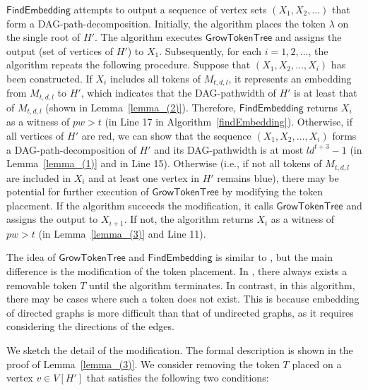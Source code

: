 \documentclass[runningheads]{llncs}
\theoremstyle{plain}
\theoremstyle{definition}
\begin{document}
$\mathsf{FindEmbedding}$ attempts to output a sequence of vertex sets $(X_1, X_2, \dots)$ that form a DAG-path-decomposition. Initially, the algorithm places the token $\lambda$ on the single root of $H'$. The algorithm executes $\mathsf{GrowTokenTree}$ and assigns the output (set of vertices of $H'$) to $X_1$. Subsequently, for each $i = 1,2,\ldots$, the algorithm repeats the following procedure. Suppose that $(X_1, X_2, \dots , X_i)$ has been constructed. If $X_i$ includes all tokens of $M_{t, d, l}$, it represents an embedding from $M_{t, d, l}$ to $H'$, which indicates that the DAG-pathwidth of $H'$ is at least that of $M_{t, d, l}$ (shown in Lemma~\ref{lemma_(2)}). Therefore, $\mathsf{FindEmbedding}$ returns $X_i$ as a witness of $pw > t$ (in Line 17 in Algorithm~\ref{findEmbedding}).  Otherwise, if all vertices of $H'$ are red, we can show that the sequence $(X_1, X_2, \dots, X_i)$ forms a DAG-path-decomposition of $H'$ and its DAG-pathwidth is at most $ld^{t+3}-1$ (in Lemma~\ref{lemma_(1)} and in Line 15). Otherwise (i.e., if not all tokens of $M_{t, d, l}$ are included in $X_i$ and at least one vertex in $H'$ remains blue), there may be potential for further execution of $\mathsf{GrowTokenTree}$ by modifying the token placement. If the algorithm succeeds the modification, it calls $\mathsf{GrowTokenTree}$ and assigns the output to $X_{i+1}$. If not, the algorithm returns $X_i$ as a witness of $pw > t$ (in Lemma~\ref{lemma_(3)} and Line 11).

The idea of $\mathsf{GrowTokenTree}$ and $\mathsf{FindEmbedding}$ is similar to \cite{art8}, but the main difference is the modification of the token placement. In \cite{art8}, there always exists a removable token $T$ until the algorithm terminates. In contrast, in this algorithm, there may be cases where such a token does not exist. This is because embedding of directed graphs is more difficult than that of undirected graphs, as it requires considering the directions of the edges. 

We sketch the detail of the modification. The formal description is shown in the proof of Lemma~\ref{lemma_(3)}.
We consider removing the token $T$ placed on a vertex $v \in V[H']$ that satisfies the following two conditions:
\end{document}
